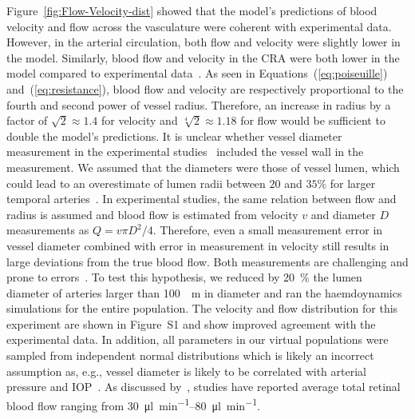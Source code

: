 \documentclass[11pt,]{article}
\begin{document}
Figure~\ref{fig:Flow-Velocity-dist} showed that the model's predictions of blood velocity and flow across the vasculature were coherent with experimental data.
However, in the arterial circulation, both flow and velocity were slightly lower in the model\cite{Riva1985,DoblhoffDier2014}.
Similarly, blood flow and velocity in the CRA were both lower in the model compared to experimental data~\cite{DoblhoffDier2014,Riva1985,Dorner2009,Feke_1989}.
As seen in Equations~(\ref{eq:poiseuille}) and~(\ref{eq:resistance}), blood flow and velocity are respectively proportional to the fourth and second power of vessel radius.
Therefore, an increase in radius by a factor of $\sqrt{2}\approx 1.4$ for velocity and $\sqrt[4]{2}\approx 1.18$ for flow would be sufficient to double the model's predictions.
It is unclear whether vessel diameter measurement in the experimental studies~\cite{DoblhoffDier2014,Riva1985} included the vessel wall in the measurement.
We assumed that the diameters were those of vessel lumen, which could lead to an overestimate of lumen radii between $20$ and $35\%$ for larger temporal arteries~\cite{Arichika2016,Damian_2021,Meixner_2015}.
In experimental studies, the same relation between flow and radius is assumed and blood flow is estimated from velocity $v$ and diameter $D$ measurements as $Q=v\pi D^2/4$.
Therefore, even a small measurement error in vessel diameter combined with error in measurement in velocity still results in large deviations from the true blood flow.
Both measurements are challenging and prone to errors~\cite{Leitgeb_2014}.
To test this hypothesis, we reduced by \SI{20}{\percent} the lumen diameter of arteries larger than \SI{100}{\mu\metre} in diameter and ran the haemdoynamics simulations for the entire population.
The velocity and flow distribution for this experiment are shown in Figure~S1 and show improved agreement with the experimental data.
In addition, all parameters in our virtual populations were sampled from independent normal distributions which is likely an incorrect assumption as, e.g., vessel diameter is likely to be correlated with arterial pressure and IOP~\cite{Dziedziak_2022}.
As discussed by~\cite{DoblhoffDier2014}, studies have reported average total retinal blood flow ranging from \SIrange[per-mode=symbol]{30}{80}{\micro\litre\per\minute}\cite{DoblhoffDier2014,Riva1985,Feke_1989}.
\end{document}
